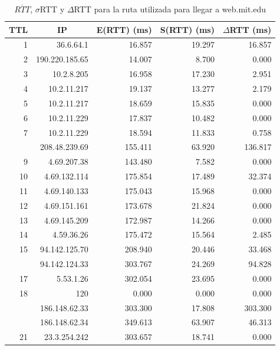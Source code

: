 \begin{table}[H]
    \begin{center}
        \begin{tabular}{| r | r | r | r | r |}
  \hline
  {\bf TTL} & \multicolumn{1}{|c|}{\bf IP} & {\bf E(RTT) (ms)} & {\bf S(RTT) (ms)} & {\bf $\Delta$RTT (ms)}\\
  \hline
\hline 1 & 36.6.64.1 & 16.857 & 19.297 & 16.857 \\
\hline 2 &  190.220.185.65 & 14.007 & 8.700 & 0.000   \\
\hline 3 &  10.2.8.205 & 16.958 & 17.230 & 2.951   \\
\hline 4 &  10.2.11.217 & 19.137 & 13.277 & 2.179   \\
\hline 5 &  10.2.11.217 & 18.659 & 15.835 &  0.000   \\
\hline 6 &  10.2.11.229 &  17.837   &  10.482   &  0.000   \\
\hline 7 &  10.2.11.229 & 18.594   &  11.833   &  0.758   \\
\rowcolor{blue!25}\hline 8 & 208.48.239.69 & 155.411   & 63.920   &  136.817   \\
\hline 9 &  4.69.207.38 & 143.480   & 7.582    &  0.000   \\
\hline 10 &  4.69.132.114 & 175.854   & 17.489   &  32.374   \\
\hline 11 &  4.69.140.133 & 175.043   & 15.968   &  0.000   \\
\hline 12 &  4.69.151.161 & 173.678   & 21.824   &  0.000   \\
\hline 13 &  4.69.145.209 & 172.987   & 14.266   &  0.000   \\
\hline 14 &  4.59.36.26 & 175.472   & 15.564   &  2.485   \\
\hline 15 &  94.142.125.70 & 208.940   & 20.446   &  33.468   \\
\rowcolor{blue!25}\hline 16 & 94.142.124.33 & 303.767   & 24.269   &  94.828   \\
\hline 17 &  5.53.1.26 & 302.054 & 23.695   &  0.000   \\
\hline 18 &  120 & 0.000 & 0.000 &  0.000   \\
\rowcolor{blue!25}\hline 19 & 186.148.62.33 & 303.300   & 17.808   &  303.300   \\
\rowcolor{blue!25}\hline 20 &  186.148.62.34 & 349.613   & 63.907   &  46.313   \\
\hline 21 &  23.3.254.242 & 303.657   & 18.741   &  0.000   \\
\hline
        \end{tabular}
        \caption{$\overline{RTT}$, $\sigma$RTT y $\Delta$RTT para la ruta utilizada para llegar a web.mit.edu}
        \label{table:mit} 
    \end{center}
\end{table}


